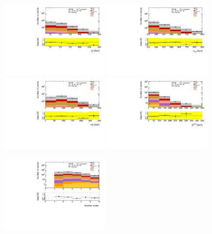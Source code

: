 \begin{figure}[htbp]
\includegraphics[width=0.49\textwidth]{data/plot/Fake_VR/pt1_VR_Fake_ee}
\includegraphics[width=0.49\textwidth]{data/plot/Fake_VR/meff_VR_Fake_ee}\\
\includegraphics[width=0.49\textwidth]{data/plot/Fake_VR/mt1_VR_Fake_ee}
\includegraphics[width=0.49\textwidth]{data/plot/Fake_VR/MET_VR_Fake_ee}\\
\begin{center}
\includegraphics[width=0.49\textwidth]{data/plot/Fake_VR/nJet_VR_Fake_ee}

\end{center}
\end{figure}
